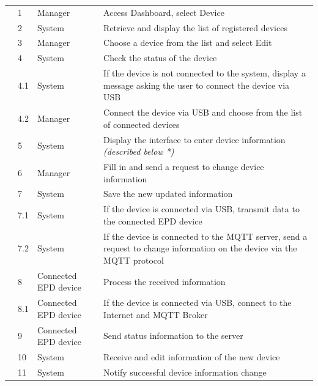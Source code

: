 \documentclass[../Main.tex]{subfiles}
\begin{document}
{\begin{longtable}{|L{2cm}|L{1cm}|L{2cm}|L{7cm}|}
        & 1     & Manager               & Access Dashboard, select Device \\ 
        & 2     & System                & Retrieve and display the list of registered devices \\ 
        & 3     & Manager               & Choose a device from the list and select Edit \\ 
        & 4     & System                & Check the status of the device \\ 
        & 4.1   & System                & If the device is not connected to the system, display a message asking the user to connect the device via USB \\ 
        & 4.2   & Manager               & Connect the device via USB and choose from the list of connected devices \\ 
        & 5     & System                & Display the interface to enter device information \textit{(described below *)} \\ 
        & 6     & Manager               & Fill in and send a request to change device information \\ 
        & 7     & System                & Save the new updated information \\ 
        & 7.1   & System                & If the device is connected via USB, transmit data to the connected EPD device \\ 
        & 7.2   & System                & If the device is connected to the MQTT server, send a request to change information on the device via the MQTT protocol \\ 
        & 8     & Connected EPD device  & Process the received information \\ 
        & 8.1   & Connected EPD device  & If the device is connected via USB, connect to the Internet and MQTT Broker \\ 
        & 9     & Connected EPD device  & Send status information to the server \\ 
        & 10    & System                & Receive and edit information of the new device \\ 
        & 11    & System                & Notify successful device information change \\ \hline


\end{longtable}}
\end{document}
